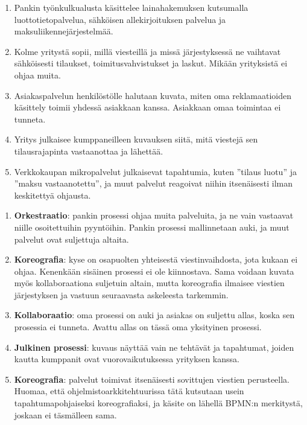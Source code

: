\documentclass[
  finnish,
  letterpaper,
  DIV=11,
  numbers=noendperiod,
  oneside]{scrreprt}
\providecommand{\tightlist}{%
  \setlength{\itemsep}{0pt}\setlength{\parskip}{0pt}}
\begin{document}
\begin{enumerate}
\def\labelenumi{\arabic{enumi}.}
\tightlist
\item
  Pankin työnkulkualusta käsittelee lainahakemuksen kutsumalla
  luottotietopalvelua, sähköisen allekirjoituksen palvelua ja
  maksuliikennejärjestelmää.
\item
  Kolme yritystä sopii, millä viesteillä ja missä järjestyksessä ne
  vaihtavat sähköisesti tilaukset, toimitusvahvistukset ja laskut.
  Mikään yrityksistä ei ohjaa muita.
\item
  Asiakaspalvelun henkilöstölle halutaan kuvata, miten oma
  reklamaatioiden käsittely toimii yhdessä asiakkaan kanssa. Asiakkaan
  omaa toimintaa ei tunneta.
\item
  Yritys julkaisee kumppaneilleen kuvauksen siitä, mitä viestejä sen
  tilausrajapinta vastaanottaa ja lähettää.
\item
  Verkkokaupan mikropalvelut julkaisevat tapahtumia, kuten ''tilaus
  luotu'' ja ''maksu vastaanotettu'', ja muut palvelut reagoivat niihin
  itsenäisesti ilman keskitettyä ohjausta.
\end{enumerate}

\begin{tcolorbox}[enhanced jigsaw, arc=.35mm, bottomrule=.15mm, bottomtitle=1mm, breakable, colback=white, colbacktitle=quarto-callout-tip-color!10!white, colframe=quarto-callout-tip-color-frame, coltitle=black, left=2mm, leftrule=.75mm, opacityback=0, opacitybacktitle=0.6, rightrule=.15mm, title=\textcolor{quarto-callout-tip-color}{\faLightbulb}\hspace{0.5em}{Malliratkaisu}, titlerule=0mm, toprule=.15mm, toptitle=1mm]

\begin{enumerate}
\def\labelenumi{\arabic{enumi}.}
\tightlist
\item
  \textbf{Orkestraatio}: pankin prosessi ohjaa muita palveluita, ja ne
  vain vastaavat niille osoitettuihin pyyntöihin. Pankin prosessi
  mallinnetaan auki, ja muut palvelut ovat suljettuja altaita.
\item
  \textbf{Koreografia}: kyse on osapuolten yhteisestä viestinvaihdosta,
  jota kukaan ei ohjaa. Kenenkään sisäinen prosessi ei ole kiinnostava.
  Sama voidaan kuvata myös kollaboraationa suljetuin altain, mutta
  koreografia ilmaisee viestien järjestyksen ja vastuun seuraavasta
  askeleesta tarkemmin.
\item
  \textbf{Kollaboraatio}: oma prosessi on auki ja asiakas on suljettu
  allas, koska sen prosessia ei tunneta. Avattu allas on tässä oma
  yksityinen prosessi.
\item
  \textbf{Julkinen prosessi}: kuvaus näyttää vain ne tehtävät ja
  tapahtumat, joiden kautta kumppanit ovat vuorovaikutuksessa yrityksen
  kanssa.
\item
  \textbf{Koreografia}: palvelut toimivat itsenäisesti sovittujen
  viestien perusteella. Huomaa, että ohjelmistoarkkitehtuurissa tätä
  kutsutaan usein tapahtumapohjaiseksi koreografiaksi, ja käsite on
  lähellä BPMN:n merkitystä, joskaan ei täsmälleen sama.
\end{enumerate}

\end{tcolorbox}
\end{document}
